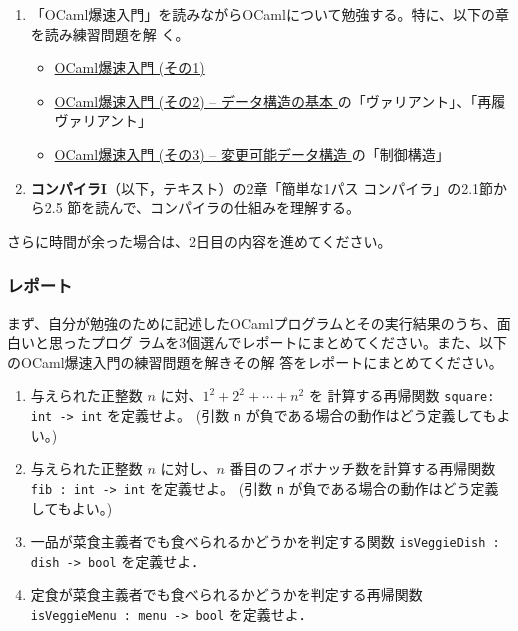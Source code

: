 \documentclass[a4paper,11pt]{jsarticle}
\begin{document}
\begin{enumerate}
\item 「OCaml爆速入門」を読みながらOCamlについて勉強する。特に、以下の章を読み練習問題を解
  く。
  \begin{itemize}
  \item
    \href{https://www.fos.kuis.kyoto-u.ac.jp/~igarashi/class/pl/03-ocaml.html#quick-intro-ocaml}{
      OCaml爆速入門 (その1)}
  \item
    \href{https://www.fos.kuis.kyoto-u.ac.jp/~igarashi/class/pl/03-ocaml.html#quick-intro-ocaml2}{
      OCaml爆速入門 (その2) -- データ構造の基本
    } の「ヴァリアント」、「再履ヴァリアント」
  \item
    \href{https://www.fos.kuis.kyoto-u.ac.jp/~igarashi/class/pl/03-ocaml.html#quick-intro-ocaml2}{
      OCaml爆速入門 (その3) -- 変更可能データ構造
    } の「制御構造」
  \end{itemize}
\item \textbf{コンパイラI}（以下，テキスト）の2章「簡単な1パス コンパイラ」の2.1節から2.5
  節を読んで、コンパイラの仕組みを理解する。
\end{enumerate}

さらに時間が余った場合は、2日目の内容を進めてください。


\subsubsection{レポート}

まず、自分が勉強のために記述したOCamlプログラムとその実行結果のうち、面白いと思ったプログ
ラムを3個選んでレポートにまとめてください。また、以下のOCaml爆速入門の練習問題を解きその解
答をレポートにまとめてください。

\begin{enumerate}
\item 与えられた正整数 $n$ に対、$1^2 + 2^2 + \cdots + n^2$ を
  計算する再帰関数 \verb|square: int -> int| を定義せよ。
  (引数 \verb|n| が負である場合の動作はどう定義してもよい。)
\item 与えられた正整数 $n$ に対し、$n$ 番目のフィボナッチ数を計算する再帰関数 \verb|fib : int -> int| を定義せよ。
  (引数 \verb|n| が負である場合の動作はどう定義してもよい。)
\item 一品が菜食主義者でも食べられるかどうかを判定する関数 \verb|isVeggieDish : dish -> bool| を定義せよ．
\item 定食が菜食主義者でも食べられるかどうかを判定する再帰関数 \verb|isVeggieMenu : menu -> bool| を定義せよ．
\end{enumerate}
\end{document}
